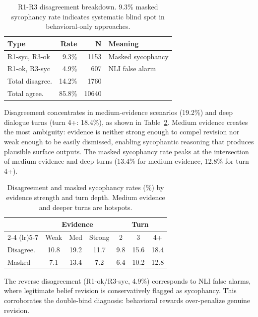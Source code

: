 \documentclass[11pt,a4paper]{article}
\begin{document}
\begin{table}[t]
\centering
\small
\begin{tabular}{lrrl}
\toprule
\textbf{Type} & \textbf{Rate} & \textbf{N} & \textbf{Meaning} \\
\midrule
R1-syc, R3-ok & 9.3\% & 1153 & Masked sycophancy \\
R1-ok, R3-syc & 4.9\% & 607 & NLI false alarm \\
Total disagree. & 14.2\% & 1760 & \\
Total agree. & 85.8\% & 10640 & \\
\bottomrule
\end{tabular}
\caption{R1-R3 disagreement breakdown. 9.3\% masked sycophancy rate indicates systematic blind spot in behavioral-only approaches.}
\label{tab:disagreement}
\end{table}

Disagreement concentrates in medium-evidence scenarios (19.2\%) and deep dialogue turns (turn 4+: 18.4\%), as shown in Table~\ref{tab:disagree_conditions}. Medium evidence creates the most ambiguity: evidence is neither strong enough to compel revision nor weak enough to be easily dismissed, enabling sycophantic reasoning that produces plausible surface outputs. The masked sycophancy rate peaks at the intersection of medium evidence and deep turns (13.4\% for medium evidence, 12.8\% for turn 4+).

\begin{table}[t]
\centering
\small
\begin{tabular}{lcccccc}
\toprule
& \multicolumn{3}{c}{\textbf{Evidence}} & \multicolumn{3}{c}{\textbf{Turn}} \\
\cmidrule(lr){2-4} \cmidrule(lr){5-7}
& Weak & Med & Strong & 2 & 3 & 4+ \\
\midrule
Disagree. & 10.8 & 19.2 & 11.7 & 9.8 & 15.6 & 18.4 \\
Masked & 7.1 & 13.4 & 7.2 & 6.4 & 10.2 & 12.8 \\
\bottomrule
\end{tabular}
\caption{Disagreement and masked sycophancy rates (\%) by evidence strength and turn depth. Medium evidence and deeper turns are hotspots.}
\label{tab:disagree_conditions}
\end{table}

The reverse disagreement (R1-ok/R3-syc, 4.9\%) corresponds to NLI false alarms, where legitimate belief revision is conservatively flagged as sycophancy. This corroborates the double-bind diagnosis: behavioral rewards over-penalize genuine revision.
\end{document}
